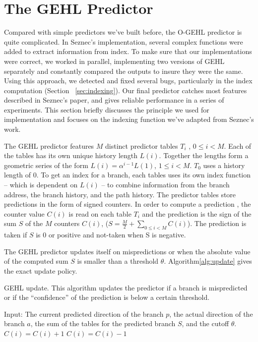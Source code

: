 \section{The GEHL Predictor}
\label{sec:gehl}
Compared with simple predictors we've built before, the O-GEHL predictor is quite complicated. In Seznec's implementation, several complex functions were added to extract information from index. To make sure that our implementations were correct, we worked in parallel, implementing two versions of GEHL separately and constantly compared the outputs to insure they were the same.   Using this approach, we detected and fixed several bugs, particularly in the index computation (Section ~\ref{sec:indexing}). Our final predictor catches most features described in Seznec's paper, and gives reliable performance in a series of experiments. This section briefly discusses the principle we used for implementation and focuses on the indexing function we've adapted from Seznec's work.

The GEHL predictor features $M$ distinct predictor tables $T_i$ , $0\leq i < M$.  Each of the tables has its own unique history length $L(i)$.  Together the lengths form a geometric series of the form $L(i)=\alpha^{i-1}L(1)$, $1\leq i < M$. $T_0$ uses a history length of 0.  To get an index for a branch, each tables uses its own index function -- which is dependent on $L(i)$ -- to combine information from the branch address, the branch history, and the path history.  The predictor tables store predictions in the form of signed counters. In order to compute a prediction , the counter value $C(i)$ is read on each table $T_i$ and the prediction is the sign of the sum $S$ of the $M$ counters $C(i)$, ($S = \frac{M}{2}+\sum_{0 \leq i < M} C(i)$). The prediction is taken if $S$ is 0 or positive and not-taken when S is negative.

The GEHL predictor updates itself on mispredictions or when the absolute value of the computed sum $S$ is smaller than a threshold $\theta$.  Algorithm\ref{alg:update} gives the exact update policy.
\begin{algorithm}[t]
  \label{alg:update}
  \caption{ GEHL update.  This algorithm updates the predictor if a branch is mispredicted or if the ``confidence'' of the prediction is below a certain threshold.}
  \begin{algorithmic}[1]
    \STATE Input: The current predicted direction of the branch $p$, the actual direction of the branch $a$, the sum of the tables for the predicted branch $S$, and the cutoff $\theta$.
    \STATE
        \STATE $C(i)=C(i)+1$
      \ELSE
        \STATE $C(i)=C(i)-1$
      \ENDIF
    \ENDFOR
    \ENDIF
  \end{algorithmic}
\end{algorithm}
